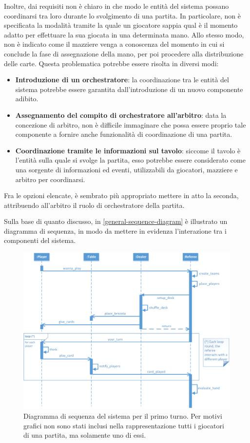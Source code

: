 \documentclass[a4paper,12pt]{article}
\begin{document}
Inoltre, dai requisiti non è chiaro in che modo le entità del sistema possano coordinarsi tra loro durante lo svolgimento di una partita. In particolare, non è specificata la modalità tramite la quale un giocatore sappia qual è il momento adatto per effettuare la sua giocata in una determinata mano. Allo stesso modo, non è indicato come il mazziere venga a conoscenza del momento in cui si conclude la fase di assegnazione della mano, per poi procedere alla distribuzione delle carte. Questa problematica potrebbe essere risolta in diversi modi:
\begin{itemize}
	\item \textbf{Introduzione di un orchestratore}: la coordinazione tra le entità del sistema potrebbe essere garantita dall'introduzione di un nuovo componente adibito.
	\item \textbf{Assegnamento del compito di orchestratore all'arbitro}: data la concezione di arbitro, non è difficile immaginare che possa essere proprio tale componente a fornire anche funzionalità di coordinazione di una partita.
	\item \textbf{Coordinazione tramite le informazioni sul tavolo}: siccome il tavolo è l'entità sulla quale si svolge la partita, esso potrebbe essere considerato come una sorgente di informazioni ed eventi, utilizzabili da giocatori, mazziere e arbitro per coordinarsi.
\end{itemize}
Fra le opzioni elencate, è sembrato più appropriato mettere in atto la seconda, attribuendo all'arbitro il ruolo di orchestratore della partita.

Sulla base di quanto discusso, in \autoref{general-sequence-diagram} è illustrato un diagramma di sequenza, in modo da mettere in evidenza l'interazione tra i componenti del sistema.


\begin{figure}[H]
	\hspace*{-0.7in}
	\centering
	\includegraphics[width=180mm]{./img/general_sequence_diagram.png}
	\caption{Diagramma di sequenza del sistema per il primo turno. Per motivi grafici non sono stati inclusi nella rappresentazione tutti i giocatori di una partita, ma solamente uno di essi. \label{general-sequence-diagram}}
\end{figure}
\end{document}
